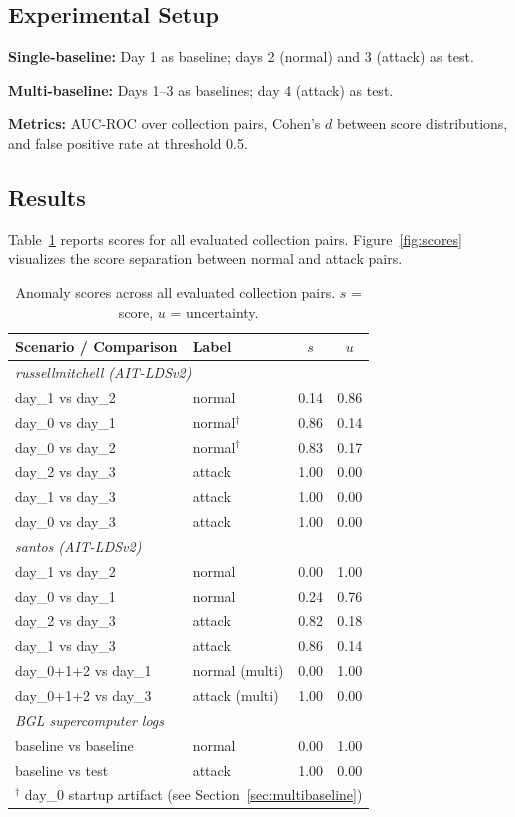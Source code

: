 \documentclass[10pt,twocolumn]{article}
\begin{document}
\subsection{Experimental Setup}

\textbf{Single-baseline:} Day 1 as baseline; days 2 (normal) and 3 (attack) as test.

\textbf{Multi-baseline:} Days 1--3 as baselines; day 4 (attack) as test.

\textbf{Metrics:} AUC-ROC over collection pairs, Cohen's $d$ between score distributions, and false positive rate at threshold 0.5.

\subsection{Results}

Table~\ref{tab:results} reports scores for all evaluated collection pairs. Figure~\ref{fig:scores} visualizes the score separation between normal and attack pairs.

\begin{table}[h]
\centering
\caption{Anomaly scores across all evaluated collection pairs. $s$ = score, $u$ = uncertainty.}
\label{tab:results}
\small
\begin{tabular}{llcc}
\toprule
Scenario / Comparison & Label & $s$ & $u$ \\
\midrule
\multicolumn{4}{l}{\textit{russellmitchell (AIT-LDSv2)}} \\
day\_1 vs day\_2 & normal & 0.14 & 0.86 \\
day\_0 vs day\_1 & normal$^\dagger$ & 0.86 & 0.14 \\
day\_0 vs day\_2 & normal$^\dagger$ & 0.83 & 0.17 \\
day\_2 vs day\_3 & attack & 1.00 & 0.00 \\
day\_1 vs day\_3 & attack & 1.00 & 0.00 \\
day\_0 vs day\_3 & attack & 1.00 & 0.00 \\
\midrule
\multicolumn{4}{l}{\textit{santos (AIT-LDSv2)}} \\
day\_1 vs day\_2 & normal & 0.00 & 1.00 \\
day\_0 vs day\_1 & normal & 0.24 & 0.76 \\
day\_2 vs day\_3 & attack & 0.82 & 0.18 \\
day\_1 vs day\_3 & attack & 0.86 & 0.14 \\
day\_0+1+2 vs day\_1 & normal (multi) & 0.00 & 1.00 \\
day\_0+1+2 vs day\_3 & attack (multi) & 1.00 & 0.00 \\
\midrule
\multicolumn{4}{l}{\textit{BGL supercomputer logs}} \\
baseline vs baseline & normal & 0.00 & 1.00 \\
baseline vs test & attack & 1.00 & 0.00 \\
\bottomrule
\multicolumn{4}{l}{$^\dagger$ day\_0 startup artifact (see Section~\ref{sec:multibaseline})} \\
\end{tabular}
\end{table}
\end{document}

